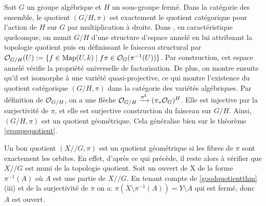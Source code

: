 \begin{ex}\label{groupQuotientGeometrique}
Soit $G$ un groupe algébrique et $H$ un sous-groupe fermé. Dans la catégorie des ensemble, le quotient $(G/H,\pi)$ est exactement le quotient catégorique pour l'action de $H$ sur $G$ par multiplication à droite. Dans \cite[5.5.5]{LAGSpringer}, en caractéristique quelconque, on munit $G/H$ d'une structure d'espace annelé en lui attribuant la topologie quotient puis en définissant le faisceau structural par $\mathcal{O}_{G/H}(U):=\lbrace f\in\textrm{Map}(U,k)\mid f\pi \in \mathcal{O}_G(\pi^{-1}(U))\rbrace$. Par construction, cet espace annelé vérifie la propriété universelle de factorisation. De plus, on montre ensuite qu'il est isomorphe à une variété quasi-projective, ce qui montre l'existence du quotient catégorique $(G/H,\pi)$ dans la catégorie des variétés algébriques. Par définition de $\mathcal{O}_{G/H}$, on a une flèche $\mathcal{O}_{G/H} \xrightarrow{\pi^\sharp} (\pi_*\mathcal{O}_G)^H$. Elle est injective par la surjectivité de $\pi$, et elle est surjective construction du faisceau sur $G/H$. Ainsi, $(G/H,\pi)$ est un quotient géométrique. Cela généralise bien sur le théorème \ref{groupequotient}.
\end{ex}

\begin{ex}
Un bon quotient $(X//G, \pi)$ est un quotient géométrique si les fibres de $\pi$ sont exactement les orbites. En effet, d'après ce qui précède, il reste alors à vérifier que $X//G$ est muni de la topologie quotient. Soit un ouvert de X de la forme $\pi^{-1}(A)$ où $A$ est une partie de $X//G$. En tenant compte de \ref{goodquotientthm} (iii) et de la surjectivité de $\pi$ on a: $\pi(X\setminus \pi^{-1}(A))=Y\setminus A$ qui est fermé, donc $A$ est ouvert.
\end{ex}

